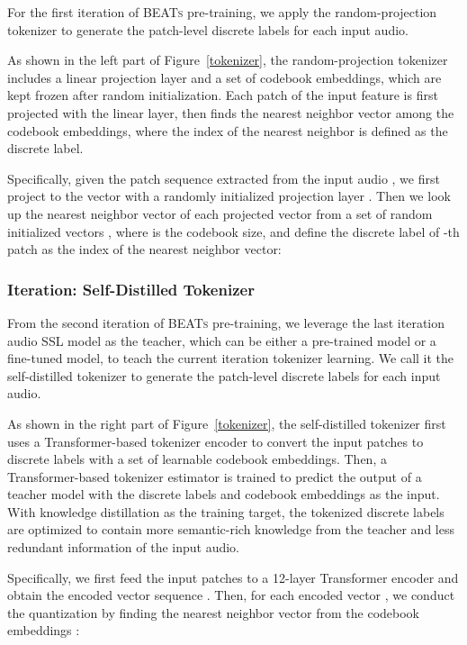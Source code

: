 \documentclass{article}
\theoremstyle{plain}
\theoremstyle{definition}
\theoremstyle{remark}
\newcommand\our{\textsc{BEATs}}
\begin{document}
For the first iteration of \our{}  pre-training, we apply the random-projection tokenizer \citep{chiu2022self} to generate the patch-level discrete labels for each input audio.

As shown in the left part of Figure~\ref{tokenizer}, the random-projection tokenizer includes a linear projection layer and a set of codebook embeddings, which are kept frozen after random initialization.
Each patch of the input feature is first projected with the linear layer, then finds the nearest neighbor vector among the codebook embeddings, where the index of the nearest neighbor is defined as the discrete label.

Specifically, given the patch sequence extracted from the input audio , we first project  to the vector  with a randomly initialized projection layer .
Then we look up the nearest neighbor vector of each projected vector  from a set of random initialized vectors , where  is the codebook size, and define the discrete label of -th patch as the index of the nearest neighbor vector: 


\subsubsection{Iteration: Self-Distilled Tokenizer}
\label{sssec:distill_tokenizer}

From the second iteration of \our{}  pre-training, we leverage the last iteration audio SSL  model as the teacher, which can be either a pre-trained model or a fine-tuned model, to teach the current iteration tokenizer learning. We call it the self-distilled tokenizer to generate the patch-level discrete labels for each input audio.

As shown in the right part of Figure~\ref{tokenizer}, the self-distilled tokenizer first uses a Transformer-based tokenizer encoder to convert the input patches to discrete labels with a set of learnable codebook embeddings.
Then, a Transformer-based tokenizer estimator is trained to predict the output of a  teacher model with the discrete labels and codebook embeddings as the input. 
With knowledge distillation as the training target, the tokenized discrete labels are optimized to contain more  semantic-rich knowledge from the teacher and less  redundant information of the input audio.

Specifically, we first feed the input patches   to a 12-layer Transformer encoder and obtain the encoded vector sequence . 
Then, for each encoded vector , we conduct the quantization by finding the nearest neighbor vector  from the codebook embeddings :
\end{document}
